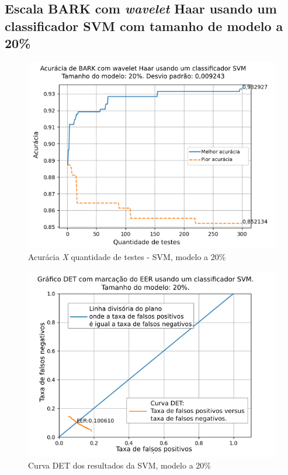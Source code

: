 \subsection{Escala BARK com \textit{wavelet} Haar usando um classificador SVM com tamanho de modelo a 20\%}



\begin{figure}[h]
	\centering
	\includegraphics[width=.95\linewidth]{images/results/confusionMatrices/classifier_SVM_20.png}
	\caption{Acurácia \textit{X} quantidade de testes - SVM, modelo a 20\%}
	\label{fig:classifiersvm20}
\end{figure}

\begin{figure}[h]
	\centering
	\includegraphics[width=.9\linewidth]{images/results/det/DET_SVM_20}
	\caption{Curva DET dos resultados da SVM, modelo a 20\%}
	\label{fig:detsvm20}
\end{figure}

